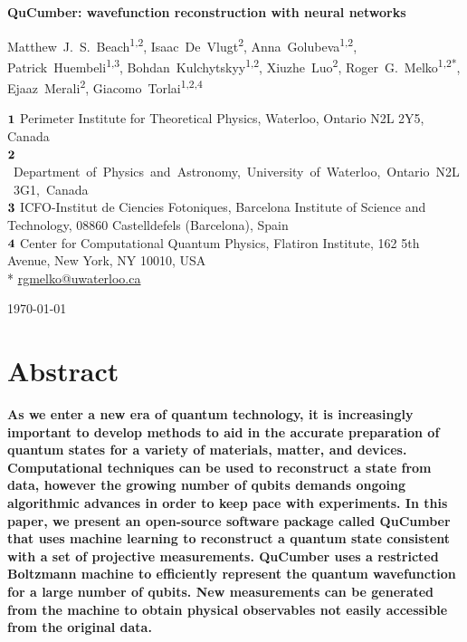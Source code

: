 \documentclass[submission, Phys, hidelnks]{SciPost}
\begin{document}
\begin{center}{\Large \textbf{
    QuCumber: wavefunction reconstruction with neural networks
}}\end{center}

\begin{center}
    Matthew~J.~S.~Beach\textsuperscript{1,2},
    Isaac~De~Vlugt\textsuperscript{2},
    Anna~Golubeva\textsuperscript{1,2},
    Patrick~Huembeli\textsuperscript{1,3},
    Bohdan~Kulchytskyy\textsuperscript{1,2},
    Xiuzhe~Luo\textsuperscript{2},
    Roger~G.~Melko\textsuperscript{1,2*},
    Ejaaz~Merali\textsuperscript{2},
    Giacomo~Torlai\textsuperscript{1,2,4}
\end{center}

\begin{center}
    ${\bf 1}$ Perimeter Institute for Theoretical Physics, Waterloo,
    Ontario N2L 2Y5, Canada
    \\
    \mbox{${\bf 2}$ Department of Physics and Astronomy, University of Waterloo,
    Ontario N2L 3G1, Canada}
    \\
    ${\bf 3}$ ICFO-Institut de Ciencies Fotoniques, Barcelona Institute of Science and Technology,
    08860 Castelldefels (Barcelona), Spain
    \\
    ${\bf 4}$ Center for Computational Quantum Physics, Flatiron Institute,
    162 5th Avenue, New York, NY 10010, USA\\

    * \href{mailto:rgmelko@uwaterloo.ca}{rgmelko@uwaterloo.ca}
\end{center}
\begin{center}
\today
\end{center}
\section*{Abstract}
{\bf
As we enter a new era of quantum technology, it is increasingly important to
develop methods to aid in the accurate preparation of quantum states
for a variety of materials, matter, and devices. 
Computational techniques can be used to reconstruct a state from data,
however the growing number of qubits demands ongoing algorithmic advances
in order to keep pace with experiments.
In this paper, we present an open-source software package called QuCumber that
uses machine learning to reconstruct a quantum state consistent
with a set of projective measurements. QuCumber uses a restricted
Boltzmann machine to efficiently represent the quantum wavefunction for a large
number of qubits.
New measurements can be generated from the machine to
obtain physical observables not easily accessible from the original data.
}
\end{document}
